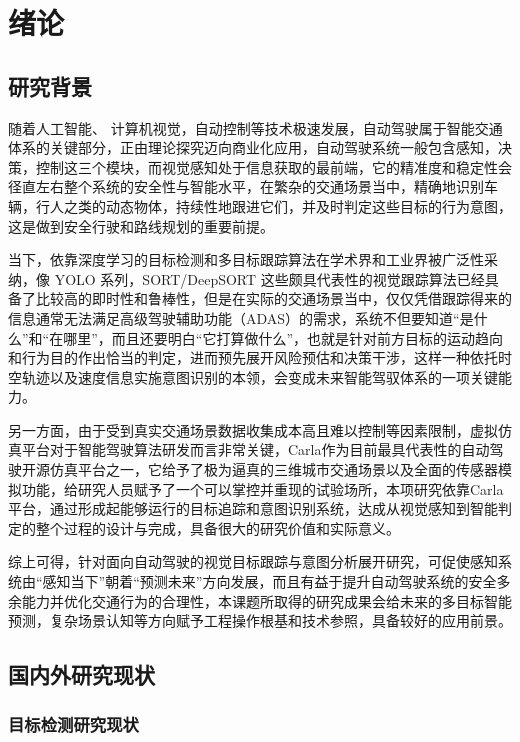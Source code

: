 \chapter{绪论}



\section{研究背景}

随着人工智能、 计算机视觉，自动控制等技术极速发展，自动驾驶属于智能交通体系的关键部分，正由理论探究迈向商业化应用，自动驾驶系统一般包含感知，决策，控制这三个模块，而视觉感知处于信息获取的最前端，它的精准度和稳定性会径直左右整个系统的安全性与智能水平，在繁杂的交通场景当中，精确地识别车辆，行人之类的动态物体，持续性地跟进它们，并及时判定这些目标的行为意图，这是做到安全行驶和路线规划的重要前提。

当下，依靠深度学习的目标检测和多目标跟踪算法在学术界和工业界被广泛性采纳，像 YOLO 系列，SORT/DeepSORT 这些颇具代表性的视觉跟踪算法已经具备了比较高的即时性和鲁棒性，但是在实际的交通场景当中，仅仅凭借跟踪得来的信息通常无法满足高级驾驶辅助功能（ADAS）的需求，系统不但要知道“是什么”和“在哪里”，而且还要明白“它打算做什么”，也就是针对前方目标的运动趋向和行为目的作出恰当的判定，进而预先展开风险预估和决策干涉，这样一种依托时空轨迹以及速度信息实施意图识别的本领，会变成未来智能驾驭体系的一项关键能力。

另一方面，由于受到真实交通场景数据收集成本高且难以控制等因素限制，虚拟仿真平台对于智能驾驶算法研发而言非常关键，Carla作为目前最具代表性的自动驾驶开源仿真平台之一，它给予了极为逼真的三维城市交通场景以及全面的传感器模拟功能，给研究人员赋予了一个可以掌控并重现的试验场所，本项研究依靠Carla平台，通过形成起能够运行的目标追踪和意图识别系统，达成从视觉感知到智能判定的整个过程的设计与完成，具备很大的研究价值和实际意义。

综上可得，针对面向自动驾驶的视觉目标跟踪与意图分析展开研究，可促使感知系统由“感知当下”朝着“预测未来”方向发展，而且有益于提升自动驾驶系统的安全多余能力并优化交通行为的合理性，本课题所取得的研究成果会给未来的多目标智能预测，复杂场景认知等方向赋予工程操作根基和技术参照，具备较好的应用前景。

\section{国内外研究现状}

\subsection{目标检测研究现状}

